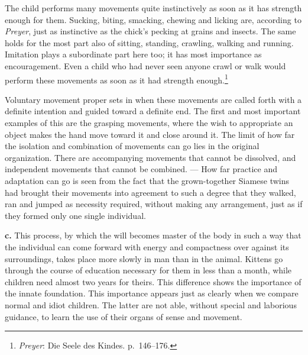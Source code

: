 \documentclass[12pt,a4paper]{book}
\newcommand{\opage}[1]{\marginnote{\footnotesize\textit{[#1]}}}
\begin{document}
\opage{378}The child performs many movements quite instinctively as soon
as it has strength enough for them. Sucking, biting, smacking, chewing and
licking are, according to \emph{Preyer}, just as instinctive as the
chick's pecking at grains and insects. The same holds for the most part
also of sitting, standing, crawling, walking and running. Imitation plays
a subordinate part here too; it has most importance as encouragement.
Even a child who had never seen anyone crawl or walk would perform these
movements as soon as it had strength
enough.\footnote{\emph{Preyer}: Die Seele des Kindes. p.~146--176.}

Voluntary movement proper sets in when these movements are called forth
with a definite intention and guided toward a definite end. The first and
most important examples of this are the grasping movements, where the
wish to appropriate an object makes the hand move toward it and close
around it. The limit of how far the isolation and combination of
movements can go lies in the original organization. There are
accompanying movements that cannot be dissolved, and independent
movements that cannot be combined. --- How far practice and adaptation
can go is seen from the fact that the grown-together Siamese twins had
brought their movements into agreement to such a degree that they walked,
ran and jumped as necessity required, without making any arrangement,
just as if they formed only one single individual.

\textbf{c.} This process, by which the will becomes master of the body in
such a way that the individual can come forward with energy and
compactness over against its surroundings, takes place more slowly in man
than in the animal. Kittens go through the course of education necessary
for them in less than a month, while children need almost two years for
theirs. This difference shows the importance of the innate foundation.
This importance appears just as clearly when we compare normal and
idiot children. The latter are not able, without special and laborious
guidance, to learn the use of their organs of sense and movement.
\end{document}
